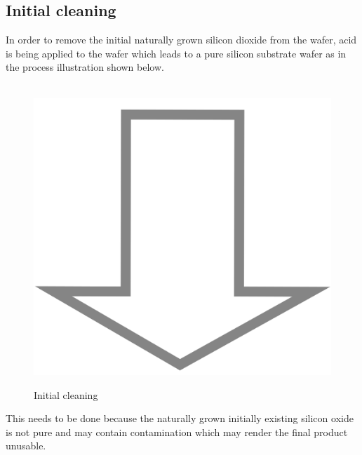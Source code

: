 \subsection{Initial cleaning}
In order to remove the initial naturally grown silicon dioxide from the wafer, acid is being applied to the wafer which leads to a pure silicon substrate wafer as in the process illustration shown below.

\begin{figure}[H]
	\centering
	\begin{tikzpicture}[node distance = 3cm, auto, thick,scale=\CrossSectionOnly, every node/.style={transform shape}]
		
	\end{tikzpicture} \\
	\includegraphics[scale=0.01]{down_arrow.png} \\
	\begin{tikzpicture}[node distance = 3cm, auto, thick,scale=\CrossSectionOnly, every node/.style={transform shape}]
		
	\end{tikzpicture}
	\caption{Initial cleaning}
\end{figure}

This needs to be done because the naturally grown initially existing silicon oxide is not pure and may contain contamination which may render the final product unusable.

